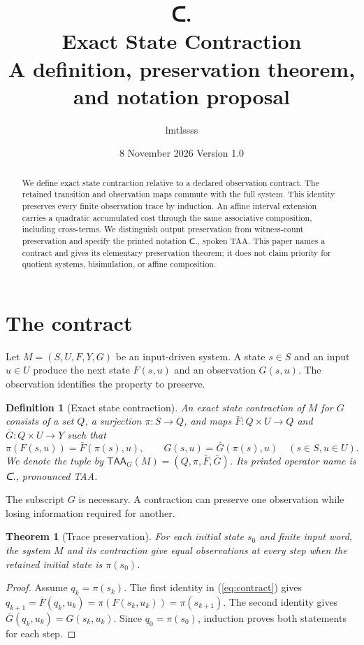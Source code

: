 \documentclass[11pt,a4paper]{article}
\title{{\taafont ᑕ.}\\Exact State Contraction\\\large A definition, preservation theorem, and notation proposal}
\author{lmtlssss}
\date{8 November 2026 \quad Version 1.0}
\newtheorem{definition}{Definition}
\newtheorem{theorem}{Theorem}
\newcommand{\TAA}{\mathsf{TAA}}
\begin{document}
\maketitle
\begin{abstract}
We define exact state contraction relative to a declared observation contract.
The retained transition and observation maps commute with the full system.
This identity preserves every finite observation trace by induction.
An affine interval extension carries a quadratic accumulated cost through the
same associative composition, including cross-terms. We distinguish output
preservation from witness-count preservation and specify the printed notation
{\taafont ᑕ.}, spoken TAA. This paper names a contract and gives its elementary
preservation theorem; it does not claim priority for quotient systems,
bisimulation, or affine composition.
\end{abstract}

\section{The contract}
Let $M=(S,U,F,Y,G)$ be an input-driven system. A state $s\in S$ and an
input $u\in U$ produce the next state $F(s,u)$ and an observation $G(s,u)$.
The observation identifies the property to preserve.
\begin{definition}[Exact state contraction]
An exact state contraction of $M$ for $G$ consists of a set $Q$, a
surjection $\pi:S\rightarrow Q$, and maps
$\bar F:Q\times U\rightarrow Q$ and $\bar G:Q\times U\rightarrow Y$ such that
\begin{equation}\label{eq:contract}
 \pi(F(s,u))=\bar F(\pi(s),u),\qquad
 G(s,u)=\bar G(\pi(s),u)
 \quad (s\in S,u\in U).
\end{equation}
We denote the tuple by $\TAA_G(M)=(Q,\pi,\bar F,\bar G)$.
Its printed operator name is {\taafont ᑕ.}, pronounced TAA.
\end{definition}

The subscript $G$ is necessary. A contraction can preserve one observation
while losing information required for another.

\begin{theorem}[Trace preservation]
For each initial state $s_0$ and finite input word, the system $M$ and
its contraction give equal observations at every step when the retained
initial state is $\pi(s_0)$.
\end{theorem}
\begin{proof}
Assume $q_k=\pi(s_k)$. The first identity in (\ref{eq:contract}) gives
$q_{k+1}=\bar F(q_k,u_k)=\pi(F(s_k,u_k))=\pi(s_{k+1})$.
The second identity gives
$\bar G(q_k,u_k)=G(s_k,u_k)$.
Since $q_0=\pi(s_0)$, induction proves both statements for each step.
\end{proof}
\end{document}
